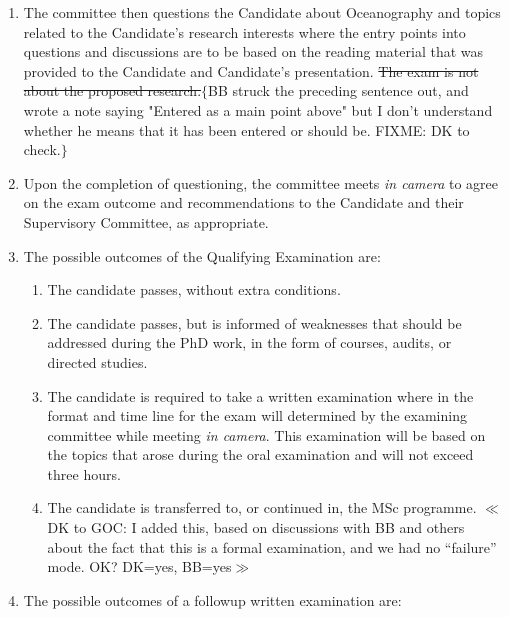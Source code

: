 \documentclass[12pt]{article}
\newcommand{\fixme}[1]{\color{fixmeColor}$\{$#1$\}$\color{black}\index{$>>>>$FIXME$<<<<$}}
\newcommand{\vote}[1]{\color{voteColor}$\ll$#1$\gg$\color{black}\marginpar[$\gg$ vote]{$\ll$ vote}\index{$>>>>$VOTE$<<<<$}}
\newcommand{\supcom}{Supervisory Committee\xspace}
\begin{document}
\begin{enumerate}
    \item The committee then questions the Candidate about Oceanography and
        topics related to the Candidate's research interests where the entry
        points into questions and discussions are to be based on the reading
        material that was provided to the Candidate and Candidate's
        presentation. \sout{The exam is not about the proposed
        research.}\fixme{BB struck the preceding sentence out, and wrote a note
        saying "Entered as a main point above" but I don't understand whether
        he means that it has been entered or should be. FIXME: DK to check.}

    \item Upon the completion of questioning, the committee meets \emph{in
        camera} to agree on the exam outcome and recommendations to the
        Candidate and their \supcom, as appropriate.

    \item The possible outcomes of the Qualifying Examination are:

        \begin{enumerate}
            \item The candidate passes, without extra conditions.

            \item The candidate passes, but is informed of weaknesses that
                should be addressed during the PhD work, in the form of
                courses, audits, or directed studies.

            \item The candidate is required to take a written examination where
                in the format and time line for the exam will determined by the
                examining committee while meeting \emph{in camera}. This
                examination will be based on the topics that arose during the
                oral examination and will not exceed three hours. 
                

            \item The candidate is transferred to, or continued in, the MSc
                programme.  \vote{DK to GOC: I added this, based on discussions
                with BB and others about the fact that this is a formal
                examination, and we had no ``failure'' mode.  OK? DK=yes,
                BB=yes}

        \end{enumerate}

    \item The possible outcomes of a followup written examination are:


\end{enumerate}
\end{document}
